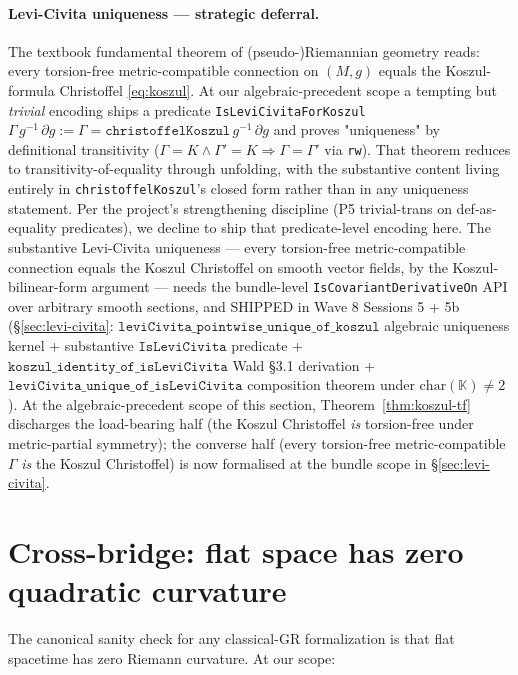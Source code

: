 \documentclass[twocolumn]{revtex4-2}
\newcommand{\Christoffel}{\Gamma}
\newcommand{\MetricMatrix}{g}
\newcommand{\PartG}{\partial g}
\begin{document}
\paragraph{Levi-Civita uniqueness — strategic deferral.}\label{rem:lc-unique-deferred}
The textbook fundamental theorem of (pseudo-)Riemannian geometry
\cite{KobayashiNomizu1963,Wald1984} reads: every torsion-free
metric-compatible connection on $(M,\MetricMatrix)$ equals the
Koszul-formula Christoffel \eqref{eq:koszul}. At our algebraic-precedent
scope a tempting but \emph{trivial} encoding ships a predicate
\texttt{IsLeviCivitaForKoszul}\,$\Christoffel\,\MetricMatrix^{-1}\,\PartG
:= \Christoffel = \texttt{christoffelKoszul}\,\MetricMatrix^{-1}\,\PartG$
and proves "uniqueness" by definitional transitivity ($\Christoffel = K
\wedge \Christoffel' = K \Rightarrow \Christoffel = \Christoffel'$ via
\texttt{rw}). That theorem reduces to transitivity-of-equality through
unfolding, with the substantive content living entirely in
\texttt{christoffelKoszul}'s closed form rather than in any uniqueness
statement. Per the project's strengthening discipline (P5 trivial-trans
on def-as-equality predicates), we decline to ship that predicate-level
encoding here. The substantive Levi-Civita uniqueness — every
torsion-free metric-compatible connection equals the Koszul Christoffel
on smooth vector fields, by the Koszul-bilinear-form argument
\cite{KobayashiNomizu1963} — needs the bundle-level
\texttt{IsCovariantDerivativeOn} API over arbitrary smooth sections,
and SHIPPED in Wave 8 Sessions 5 + 5b
(\S\ref{sec:levi-civita}: $\texttt{leviCivita\_pointwise\_unique\_of\_koszul}$
algebraic uniqueness kernel + substantive $\texttt{IsLeviCivita}$
predicate + $\texttt{koszul\_identity\_of\_isLeviCivita}$ Wald \S 3.1
derivation + $\texttt{leviCivita\_unique\_of\_isLeviCivita}$
composition theorem under $\mathrm{char}(\mathbb{K}) \neq 2$). At
the algebraic-precedent scope of this section,
Theorem~\ref{thm:koszul-tf} discharges the load-bearing half (the
Koszul Christoffel \emph{is} torsion-free under metric-partial
symmetry); the converse half (every torsion-free metric-compatible
$\Christoffel$ \emph{is} the Koszul Christoffel) is now formalised at
the bundle scope in \S\ref{sec:levi-civita}.

\section{Cross-bridge: flat space has zero quadratic curvature}\label{sec:flat}

The canonical sanity check for any classical-GR formalization is that
flat spacetime has zero Riemann curvature. At our scope:
\end{document}

